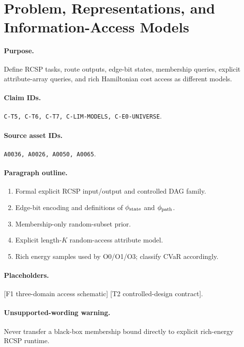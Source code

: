 \section{Problem, Representations, and Information-Access Models}

\paragraph{Purpose.}
Define RCSP tasks, route outputs, edge-bit states, membership queries, explicit
attribute-array queries, and rich Hamiltonian cost access as different models.

\paragraph{Claim IDs.}
\texttt{C-T5, C-T6, C-T7, C-LIM-MODELS, C-E0-UNIVERSE}.

\paragraph{Source asset IDs.}
\texttt{A0036, A0026, A0050, A0065}.

\paragraph{Paragraph outline.}
\begin{enumerate}
  \item Formal explicit RCSP input/output and controlled DAG family.
  \item Edge-bit encoding and definitions of $\phi_{\rm state}$ and
  $\phi_{\rm path}$.
  \item Membership-only random-subset prior.
  \item Explicit length-$K$ random-access attribute model.
  \item Rich energy samples used by O0/O1/O3; classify CVaR accordingly.
\end{enumerate}

\paragraph{Placeholders.}
[F1 three-domain access schematic] [T2 controlled-design contract].

\paragraph{Unsupported-wording warning.}
Never transfer a black-box membership bound directly to explicit rich-energy
RCSP runtime.

